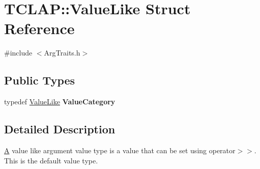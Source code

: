\hypertarget{struct_t_c_l_a_p_1_1_value_like}{\section{T\+C\+L\+A\+P\+:\+:Value\+Like Struct Reference}
\label{struct_t_c_l_a_p_1_1_value_like}
}


{\ttfamily \#include $<$Arg\+Traits.\+h$>$}

\subsection*{Public Types}
\begin{DoxyCompactItemize}
\item 
\hypertarget{struct_t_c_l_a_p_1_1_value_like_a26e6d3b8c4a608ecebe7404e42fbecf9}{typedef \hyperlink{struct_t_c_l_a_p_1_1_value_like}{Value\+Like} {\bfseries Value\+Category}}\label{struct_t_c_l_a_p_1_1_value_like_a26e6d3b8c4a608ecebe7404e42fbecf9}

\end{DoxyCompactItemize}


\subsection{Detailed Description}
\hyperlink{class_a}{A} value like argument value type is a value that can be set using operator$>$$>$. This is the default value type. 